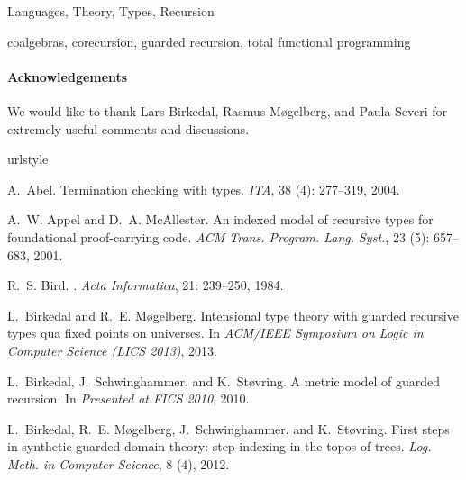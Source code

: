 \documentclass[natbib]{sigplanconf}
\begin{document}
\terms
  Languages, Theory, Types, Recursion

\keywords
  coalgebras, corecursion, guarded recursion, total functional programming







\paragraph{Acknowledgements} We would like to thank Lars Birkedal,
Rasmus M{\o}gelberg, and Paula Severi for extremely useful comments
and discussions.

\begin{thebibliography}{24}
\providecommand{\natexlab}[1]{#1}
\providecommand{\url}[1]{\texttt{#1}}
\expandafter\ifx\csname urlstyle\endcsname\relax
  \providecommand{\doi}[1]{doi: #1}\else
  \providecommand{\doi}{doi: \begingroup \urlstyle{rm}\Url}\fi

A.~Abel.
\newblock Termination checking with types.
\newblock \emph{ITA}, 38 (4): 277--319, 2004.

A.~W. Appel and D.~A. McAllester.
\newblock An indexed model of recursive types for foundational proof-carrying
  code.
\newblock \emph{ACM Trans. Program. Lang. Syst.}, 23 (5):
  657--683, 2001.

R.~S. Bird.
.
\newblock \emph{Acta Informatica}, 21: 239--250, 1984.

L.~Birkedal and R.~E. M{\o}gelberg.
\newblock Intensional type theory with guarded recursive types qua fixed points
  on universes.
\newblock In \emph{ACM/IEEE Symposium on Logic in Computer Science (LICS
  2013)}, 2013.

L.~Birkedal, J.~Schwinghammer, and K.~St{\o}vring.
\newblock A metric model of guarded recursion.
\newblock In \emph{Presented at FICS 2010}, 2010.

L.~Birkedal, R.~E. M{\o}gelberg, J.~Schwinghammer, and K.~St{\o}vring.
\newblock First steps in synthetic guarded domain theory: step-indexing in the
  topos of trees.
\newblock \emph{Log. Meth. in Computer Science}, 8 (4), 2012.


\end{thebibliography}
\end{document}
